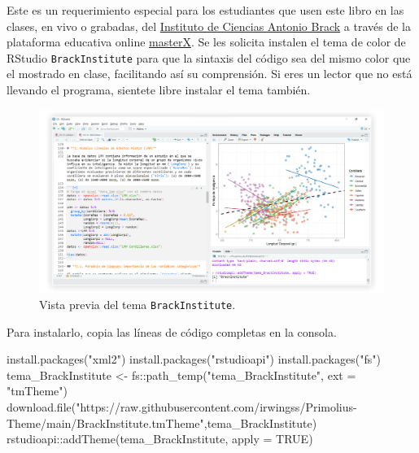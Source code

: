 \documentclass[
]{article}
\newenvironment{Shaded}{\begin{snugshade}}{\end{snugshade}}
\newcommand{\AttributeTok}[1]{\textcolor[rgb]{0.77,0.63,0.00}{#1}}
\newcommand{\ConstantTok}[1]{\textcolor[rgb]{0.00,0.00,0.00}{#1}}
\newcommand{\FunctionTok}[1]{\textcolor[rgb]{0.00,0.00,0.00}{#1}}
\newcommand{\NormalTok}[1]{#1}
\newcommand{\OtherTok}[1]{\textcolor[rgb]{0.56,0.35,0.01}{#1}}
\newcommand{\SpecialCharTok}[1]{\textcolor[rgb]{0.00,0.00,0.00}{#1}}
\newcommand{\StringTok}[1]{\textcolor[rgb]{0.31,0.60,0.02}{#1}}
\theoremstyle{definition}
\theoremstyle{definition}
\theoremstyle{definition}
\theoremstyle{definition}
\theoremstyle{remark}
\begin{document}
Este es un requerimiento especial para los estudiantes que usen este libro en las clases, en vivo o grabadas, del \href{https://www.brackinstitute.com/}{Instituto de Ciencias Antonio Brack} a través de la plataforma educativa online \href{https://www.masterx.org/}{masterX}. Se les solicita instalen el tema de color de RStudio \texttt{BrackInstitute} para que la sintaxis del código sea del mismo color que el mostrado en clase, facilitando así su comprensión. Si eres un lector que no está llevando el programa, sientete libre instalar el tema también.



\begin{figure}

{\centering \includegraphics[width=1\linewidth]{figs/screenshots/tema BrackInstitute} 

}

\caption{Vista previa del tema \texttt{BrackInstitute}.}\label{fig:figura12}
\end{figure}

Para instalarlo, copia las líneas de código completas en la consola.

\begin{Shaded}
\begin{Highlighting}[]
\FunctionTok{install.packages}\NormalTok{(}\StringTok{"xml2"}\NormalTok{)}
\FunctionTok{install.packages}\NormalTok{(}\StringTok{"rstudioapi"}\NormalTok{)}
\FunctionTok{install.packages}\NormalTok{(}\StringTok{"fs"}\NormalTok{)}
\NormalTok{tema\_BrackInstitute }\OtherTok{\textless{}{-}}\NormalTok{ fs}\SpecialCharTok{::}\FunctionTok{path\_temp}\NormalTok{(}\StringTok{"tema\_BrackInstitute"}\NormalTok{, }\AttributeTok{ext =} \StringTok{"tmTheme"}\NormalTok{)}
\FunctionTok{download.file}\NormalTok{(}\StringTok{"https://raw.githubusercontent.com/irwingss/Primolius{-}Theme/main/BrackInstitute.tmTheme"}\NormalTok{,tema\_BrackInstitute)}
\NormalTok{rstudioapi}\SpecialCharTok{::}\FunctionTok{addTheme}\NormalTok{(tema\_BrackInstitute, }\AttributeTok{apply =} \ConstantTok{TRUE}\NormalTok{)}
\end{Highlighting}
\end{Shaded}
\end{document}
